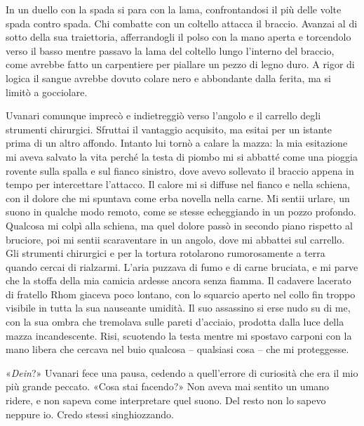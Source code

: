 In un duello con la spada si para con la lama, confrontandosi il più
delle volte spada contro spada. Chi combatte con un coltello attacca il
braccio. Avanzai al di sotto della sua traiettoria, afferrandogli il
polso con la mano aperta e torcendolo verso il basso mentre passavo la
lama del coltello lungo l'interno del braccio, come avrebbe fatto un
carpentiere per piallare un pezzo di legno duro. A rigor di logica il
sangue avrebbe dovuto colare nero e abbondante dalla ferita, ma si
limitò a gocciolare.

Uvanari comunque imprecò e indietreggiò verso l'angolo e il carrello
degli strumenti chirurgici. Sfruttai il vantaggio acquisito, ma esitai
per un istante prima di un altro affondo. Intanto lui tornò a calare la
mazza: la mia esitazione mi aveva salvato la vita perché la testa di
piombo mi si abbatté come una pioggia rovente sulla spalla e sul fianco
sinistro, dove avevo sollevato il braccio appena in tempo per
intercettare l'attacco. Il calore mi si diffuse nel fianco e nella
schiena, con il dolore che mi spuntava come erba novella nella carne. Mi
sentii urlare, un suono in qualche modo remoto, come se stesse
echeggiando in un pozzo profondo. Qualcosa mi colpì alla schiena, ma
quel dolore passò in secondo piano rispetto al bruciore, poi mi sentii
scaraventare in un angolo, dove mi abbattei sul carrello. Gli strumenti
chirurgici e per la tortura rotolarono rumorosamente a terra quando
cercai di rialzarmi. L'aria puzzava di fumo e di carne bruciata, e mi
parve che la stoffa della mia camicia ardesse ancora senza fiamma. Il
cadavere lacerato di fratello Rhom giaceva poco lontano, con lo squarcio
aperto nel collo fin troppo visibile in tutta la sua nauseante umidità.
Il suo assassino si erse nudo su di me, con la sua ombra che tremolava
sulle pareti d'acciaio, prodotta dalla luce della mazza incandescente.
Risi, scuotendo la testa mentre mi spostavo carponi con la mano libera
che cercava nel buio qualcosa -- qualsiasi cosa -- che mi proteggesse.

«\emph{Dein}?» Uvanari fece una pausa, cedendo a quell'errore di
curiosità che era il mio più grande peccato. «Cosa stai facendo?» Non
aveva mai sentito un umano ridere, e non sapeva come interpretare quel
suono. Del resto non lo sapevo neppure io. Credo stessi singhiozzando.

